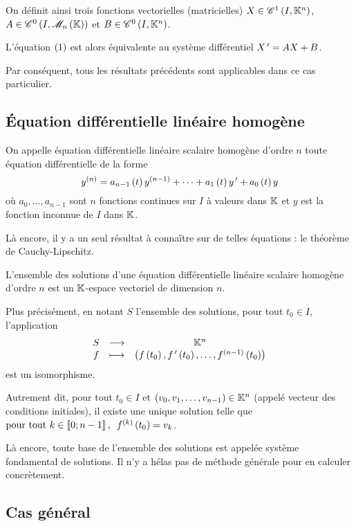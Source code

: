 On définit ainsi trois fonctions vectorielles (matricielles) \(X\in\mathscr{C}^{1}\left(I,\mathbb{K}^n\right)\), \(A\in\ensclasse{0}{I}{\M{n}}\) et \(B\in\mathscr{C}^{0}\left(I,\mathbb{K}^n\right)\).

L'équation \(\left(1\right)\) est alors équivalente au système différentiel \(X^{\,\prime}=AX+B\).

Par conséquent, tous les résultats précédents sont applicables dans ce cas particulier.

\subsection{Équation différentielle linéaire homogène}

\begin{defi}
On appelle équation différentielle linéaire scalaire homogène d'ordre \(n\) toute équation différentielle de la forme \[y^{\left(n\right)}=a_{n-1}\left(t\right)y^{\left(n-1\right)}+\dots+a_1\left(t\right)y^{\,\prime}+a_0\left(t\right)y\] où \(a_0,\dots,a_{n-1}\) sont \(n\) fonctions continues sur \(I\) à valeurs dans \(\mathbb{K}\) et \(y\) est la fonction inconnue de \(I\) dans \(\mathbb{K}\).
\end{defi}

Là encore, il y a un seul résultat à connaître sur de telles équations : le théorème de Cauchy-Lipschitz.

\begin{theo}
L'ensemble des solutions d'une équation différentielle linéaire scalaire homogène d'ordre \(n\) est un \(\mathbb{K}\)-espace vectoriel de dimension \(n\).

Plus précisément, en notant \(S\) l'ensemble des solutions, pour tout \(t_0\in I\), l'application \[\begin{array}[t]{ccc}S & \longrightarrow & \mathbb{K}^n \\ f & \longmapsto & \left(f\left(t_0\right),f^{\,\prime}\left(t_0\right),\dots,f^{\left(n-1\right)}\left(t_0\right)\right)\end{array}\] est un isomorphisme.

Autrement dit, pour tout \(t_0\in I\) et \(\left(v_0,v_1,\dots,v_{n-1}\right)\in\mathbb{K}^n\) (appelé vecteur des conditions initiales), il existe une unique solution telle que \(\quantifs{\tpt k\in\interventierii{0}{n-1}}f\deriv{k}\paren{t_0}=v_k\).
\end{theo}

Là encore, toute base de l'ensemble des solutions est appelée système fondamental de solutions. Il n'y a hélas pas de méthode générale pour en calculer concrètement.

\subsection{Cas général}

